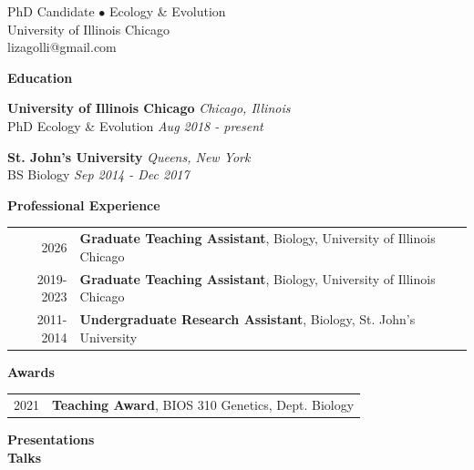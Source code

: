 \documentclass[12pt,reqno,oneside]{report}
\begin{document}
PhD Candidate $\bullet$ Ecology \& Evolution\\
University of Illinois Chicago\\
lizagolli@gmail.com

\vspace{0.5cm}

\raggedright
{\Large\textbf{Education}}\hrulefill\\

\vspace{0.25cm}

\textbf{University of Illinois Chicago} \hfill \textit{Chicago, Illinois}\\
PhD Ecology \& Evolution \hfill \textit{Aug 2018 - present}\\

\vspace{0.25cm}

\textbf{St. John's University} \hfill \textit{Queens, New York}\\
BS Biology \hfill \textit{Sep 2014 - Dec 2017}\\

\vspace{0.5cm}

{\Large\textbf{Professional Experience}}\hrulefill\\

\begin{table}[h]
    \raggedright
    \begin{tabular}{rl}
        2026 & \textbf{Graduate Teaching Assistant}, Biology, University of Illinois Chicago  \\
        2019-2023 & \textbf{Graduate Teaching Assistant}, Biology, University of Illinois Chicago  \\
        2011-2014 & \textbf{Undergraduate Research Assistant}, Biology, St. John's University
    \end{tabular}
\end{table}

{\Large\textbf{Awards}}\hrulefill\\

\begin{table}[h]
    \raggedright
    \begin{tabular}{rl}
        2021 & \textbf{Teaching Award}, BIOS 310 Genetics, Dept. Biology
    \end{tabular}
\end{table}

{\Large\textbf{Presentations}}\hrulefill\\
\vspace{0.5cm}
\textbf{Talks}
\vspace{0.25cm}
\end{document}
